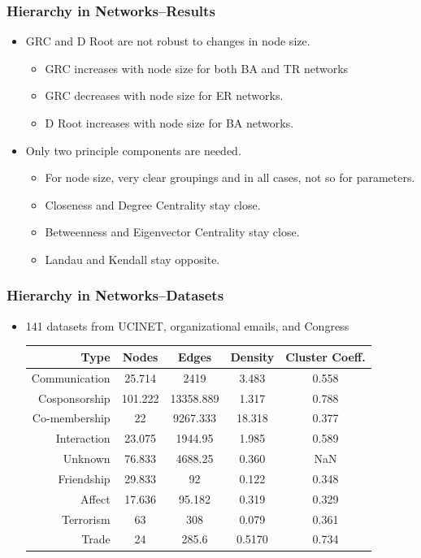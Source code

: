 \documentclass[xcolor={table}]{beamer}
\begin{document}
\begin{frame}\frametitle{Hierarchy in Networks--Results}
	\begin{itemize}
		\item GRC and D Root are not robust to changes in node size.
		\begin{itemize}
			\item GRC increases with node size for both BA and TR networks
			\item GRC decreases with node size for ER networks. 
			\item D Root increases with node size for BA networks.
		\end{itemize}
		\item Only two principle components are needed.
		\begin{itemize}
			\item For node size, very clear groupings and in all cases, not so for parameters.    
			\item Closeness and Degree Centrality stay close.
			\item Betweenness and Eigenvector Centrality stay close.
			\item Landau and Kendall stay opposite.
		\end{itemize} 
	\end{itemize}
\end{frame}

\begin{frame}\frametitle{Hierarchy in Networks--Datasets}
	\begin{itemize}
		\item 141 datasets from UCINET, organizational emails, and Congress
		\vspace{.2in}
		\scriptsize
		\begin{table}
			\begin{tabular}{| r || c | c | c | c |}
				\hline
				Type & Nodes & Edges & Density & Cluster Coeff. \\
				\hline
				Communication & 25.714  &2419  &3.483 &  0.558 \\
				Cosponsorship &101.222 &13358.889  &1.317  & 0.788\\
				Co-membership & 22  &9267.333 &18.318  & 0.377\\
				Interaction & 23.075 & 1944.95 & 1.985   &  0.589\\
				Unknown & 76.833 & 4688.25 & 0.360   &  	NaN\\
				Friendship & 29.833  &  92 & 0.122    &  0.348\\
				Affect & 17.636  &  95.182 & 0.319      &	0.329\\
				Terrorism & 63 &  308 & 0.079    &  0.361\\
				Trade & 24 &  285.6 & 0.5170     &  0.734\\
				\hline
			\end{tabular}
		\end{table}
	\end{itemize}
\end{frame}
\end{document}
